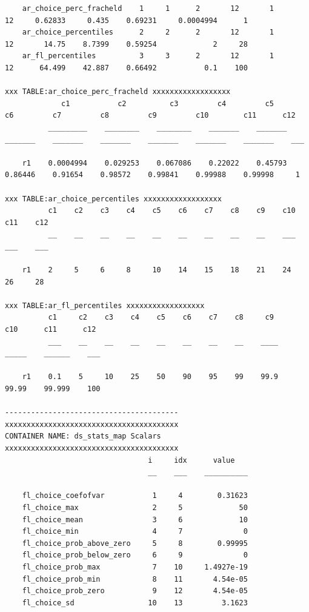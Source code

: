 \documentclass[
]{book}
\begin{document}
\begin{verbatim}
    ar_choice_perc_fracheld    1     1      2       12       1       12     0.62833     0.435    0.69231     0.0004994      1
    ar_choice_percentiles      2     2      2       12       1       12       14.75    8.7399    0.59254             2     28
    ar_fl_percentiles          3     3      2       12       1       12      64.499    42.887    0.66492           0.1    100

xxx TABLE:ar_choice_perc_fracheld xxxxxxxxxxxxxxxxxx
             c1           c2          c3         c4         c5         c6         c7         c8         c9         c10        c11      c12
          _________    ________    ________    _______    _______    _______    _______    _______    _______    _______    _______    ___

    r1    0.0004994    0.029253    0.067086    0.22022    0.45793    0.86446    0.91654    0.98572    0.99841    0.99988    0.99998     1 

xxx TABLE:ar_choice_percentiles xxxxxxxxxxxxxxxxxx
          c1    c2    c3    c4    c5    c6    c7    c8    c9    c10    c11    c12
          __    __    __    __    __    __    __    __    __    ___    ___    ___

    r1    2     5     6     8     10    14    15    18    21    24     26     28 

xxx TABLE:ar_fl_percentiles xxxxxxxxxxxxxxxxxx
          c1     c2    c3    c4    c5    c6    c7    c8     c9      c10      c11      c12
          ___    __    __    __    __    __    __    __    ____    _____    ______    ___

    r1    0.1    5     10    25    50    90    95    99    99.9    99.99    99.999    100

----------------------------------------
xxxxxxxxxxxxxxxxxxxxxxxxxxxxxxxxxxxxxxxx
CONTAINER NAME: ds_stats_map Scalars
xxxxxxxxxxxxxxxxxxxxxxxxxxxxxxxxxxxxxxxx
                                 i     idx      value   
                                 __    ___    __________

    fl_choice_coefofvar           1     4        0.31623
    fl_choice_max                 2     5             50
    fl_choice_mean                3     6             10
    fl_choice_min                 4     7              0
    fl_choice_prob_above_zero     5     8        0.99995
    fl_choice_prob_below_zero     6     9              0
    fl_choice_prob_max            7    10     1.4927e-19
    fl_choice_prob_min            8    11       4.54e-05
    fl_choice_prob_zero           9    12       4.54e-05
    fl_choice_sd                 10    13         3.1623
\end{verbatim}
\end{document}
